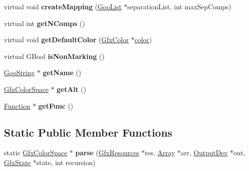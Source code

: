 \begin{DoxyCompactItemize}
\item 
\mbox{\label{class_gfx_separation_color_space_ab1105db480f515921e695bdbfd167e74}} 
virtual void {\bfseries create\+Mapping} (\hyperlink{class_goo_list}{Goo\+List} $\ast$separation\+List, int max\+Sep\+Comps)
\item 
\mbox{\label{class_gfx_separation_color_space_add14941bfff704301722e7a0e6912132}} 
virtual int {\bfseries get\+N\+Comps} ()
\item 
\mbox{\label{class_gfx_separation_color_space_ae19a6e3ff800d3a8eb82e92d4d94a832}} 
virtual void {\bfseries get\+Default\+Color} (\hyperlink{struct_gfx_color}{Gfx\+Color} $\ast$\hyperlink{structcolor}{color})
\item 
\mbox{\label{class_gfx_separation_color_space_a10a40d430b57e06836cef8babf41c8a9}} 
virtual G\+Bool {\bfseries is\+Non\+Marking} ()
\item 
\mbox{\label{class_gfx_separation_color_space_a8c952c6a73f644616075accffc8dc2bb}} 
\hyperlink{class_goo_string}{Goo\+String} $\ast$ {\bfseries get\+Name} ()
\item 
\mbox{\label{class_gfx_separation_color_space_a268b3fb2e49a6fbcb3b1427ff2f8b8ab}} 
\hyperlink{class_gfx_color_space}{Gfx\+Color\+Space} $\ast$ {\bfseries get\+Alt} ()
\item 
\mbox{\label{class_gfx_separation_color_space_a076e3ef1b3d0410428df75b9800ebd86}} 
\hyperlink{class_function}{Function} $\ast$ {\bfseries get\+Func} ()
\end{DoxyCompactItemize}
\subsection*{Static Public Member Functions}
\begin{DoxyCompactItemize}
\item 
\mbox{\label{class_gfx_separation_color_space_adfd1fad96d724069897069f644d7ed50}} 
static \hyperlink{class_gfx_color_space}{Gfx\+Color\+Space} $\ast$ {\bfseries parse} (\hyperlink{class_gfx_resources}{Gfx\+Resources} $\ast$res, \hyperlink{class_array}{Array} $\ast$arr, \hyperlink{class_output_dev}{Output\+Dev} $\ast$out, \hyperlink{class_gfx_state}{Gfx\+State} $\ast$state, int recursion)
\end{DoxyCompactItemize}
